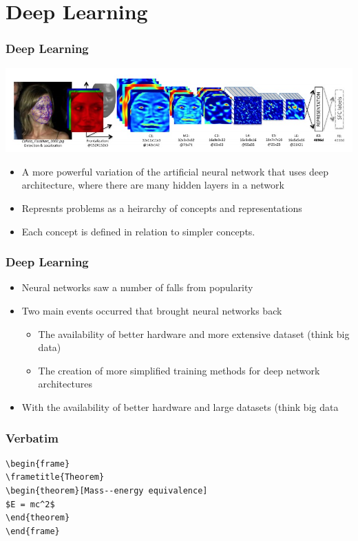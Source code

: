 \documentclass{beamer}
\begin{document}
\section{Deep Learning}
\begin{frame}
    \frametitle{Deep Learning}
    \begin{center}
        \includegraphics[scale=.34]{deepfaces}
    \end{center}
    \begin{itemize}

        \item A more powerful variation of the artificial neural network that uses deep architecture, where there are many hidden layers in a network
        \item Represnts problems as a heirarchy of concepts and representations
        \item Each concept is defined in relation to simpler concepts.
    \end{itemize}
\end{frame}
\begin{frame}
    \frametitle{Deep Learning}
    \begin{itemize}
        \item Neural networks saw a number of falls from popularity
        \item Two main events occurred that brought neural networks back
        \begin{itemize}
            \item The availability of better hardware and more extensive dataset (think big data)
            \item The creation of more simplified training methods for deep network architectures
        \end{itemize}
        \item With the availability of better hardware and large datasets (think big data
    \end{itemize}
\end{frame}

\begin{frame}[fragile] %
\frametitle{Verbatim}
\begin{example}
\begin{verbatim}
\begin{frame}
\frametitle{Theorem}
\begin{theorem}[Mass--energy equivalence]
$E = mc^2$
\end{theorem}
\end{frame}\end{verbatim}
\end{example}
\end{frame}
\end{document}
